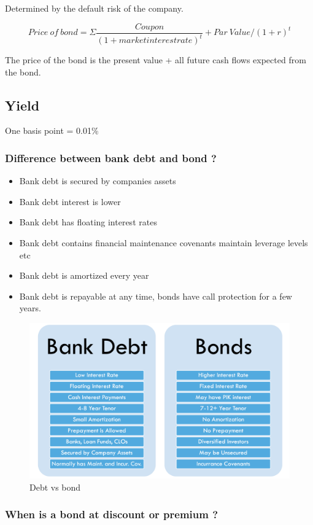 \documentclass[11pt]{scrartcl} %
\begin{document}
Determined by the default risk of the company. 

\[ Price\:of\:bond = \Sigma \frac{Coupon}{(1+market interest rate)^t} + Par\:Value/(1+r)^t \]

The price of the bond is the present value + all future cash flows expected from the bond.

\subsection{Yield}

One basis point = 0.01\% 

\subsubsection{Difference between bank debt and bond ?}

\begin{itemize}
	\item Bank debt is secured by companies assets
	\item Bank debt interest is lower
	\item Bank debt has floating interest rates
	\item Bank debt contains financial maintenance covenants maintain leverage levels etc
	\item Bank debt is amortized every year
	\item Bank debt is repayable at any time, bonds have call protection for a few years.
\end{itemize}

\begin{figure}[h] %
	\centering
	\includegraphics[width=0.5\columnwidth]{bank debt vs bond.png} %
	\caption{Debt vs bond}
\end{figure}

\subsubsection{When is a bond at discount or premium ?}
\end{document}
